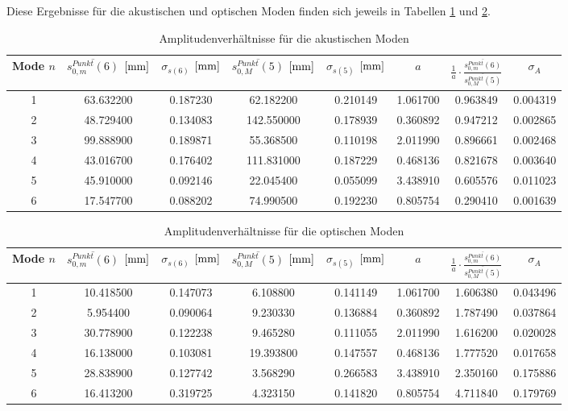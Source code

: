 \documentclass[a4paper,titlepage]{scrartcl}
\numberwithin{equation}{section}
\begin{document}
Diese Ergebnisse für die akustischen und optischen Moden finden sich jeweils in Tabellen \ref{tab:amplitudenverhaeltnisseAkustisch} und \ref{tab:amplitudenverhaeltnisseOptisch}.
\begin{table}[H]
\centering
\renewcommand{\tabcolsep}{1pt}
\begin{tabular}{@{}c|c|c|c|c|c|c|c@{}}
Mode $n$ & $\overline{s_{0,m}^{Punkt}(6)}$ $[\unit[]{mm}]$ & $\sigma_{s(6)}$ $[\unit[]{mm}]$ & $\overline{s_{0,M}^{Punkt}(5)}$ $[\unit[]{mm}]$ & $\sigma_{s(5)}$ $[\unit[]{mm}]$ & $a$ & $\frac{1}{a} \cdot \frac{\overline{s_{0,m}^{Punkt}(6)}}{\overline{s_{0,M}^{Punkt}(5)}}$ & $\sigma_A$\\
\hline
1 & 63.632200 & 0.187230 & 62.182200 & 0.210149 & 1.061700 & 0.963849 & 0.004319\\
2 & 48.729400 & 0.134083 & 142.550000 & 0.178939 & 0.360892 & 0.947212 & 0.002865\\
3 & 99.888900 & 0.189871 & 55.368500 & 0.110198 & 2.011990 & 0.896661 & 0.002468\\
4 & 43.016700 & 0.176402 & 111.831000 & 0.187229 & 0.468136 & 0.821678 & 0.003640\\
5 & 45.910000 & 0.092146 & 22.045400 & 0.055099 & 3.438910 & 0.605576 & 0.011023\\
6 & 17.547700 & 0.088202 & 74.990500 & 0.192230 & 0.805754 & 0.290410 & 0.001639\\
\end{tabular}
\caption{Amplitudenverhältnisse für die akustischen Moden}
\label{tab:amplitudenverhaeltnisseAkustisch}
\end{table}
\begin{table}[H]
\centering
\renewcommand{\tabcolsep}{1pt}
\begin{tabular}{@{}c|c|c|c|c|c|c|c@{}}
Mode $n$ & $\overline{s_{0,m}^{Punkt}(6)}$ $[\unit[]{mm}]$ & $\sigma_{s(6)}$ $[\unit[]{mm}]$ & $\overline{s_{0,M}^{Punkt}(5)}$ $[\unit[]{mm}]$ & $\sigma_{s(5)}$ $[\unit[]{mm}]$ & $a$ & $\frac{1}{a} \cdot \frac{\overline{s_{0,m}^{Punkt}(6)}}{\overline{s_{0,M}^{Punkt}(5)}}$ & $\sigma_A$\\
\hline
1 & 10.418500 & 0.147073 & 6.108800 & 0.141149 & 1.061700 & 1.606380 & 0.043496\\
2 & 5.954400 & 0.090064 & 9.230330 & 0.136884 & 0.360892 & 1.787490 & 0.037864\\
3 & 30.778900 & 0.122238 & 9.465280 & 0.111055 & 2.011990 & 1.616200 & 0.020028\\
4 & 16.138000 & 0.103081 & 19.393800 & 0.147557 & 0.468136 & 1.777520 & 0.017658\\
5 & 28.838900 & 0.127742 & 3.568290 & 0.266583 & 3.438910 & 2.350160 & 0.175886\\
6 & 16.413200 & 0.319725 & 4.323150 & 0.141820 & 0.805754 & 4.711840 & 0.179769\\
\end{tabular}
\caption{Amplitudenverhältnisse für die optischen Moden}
\label{tab:amplitudenverhaeltnisseOptisch}
\end{table}
\end{document}
